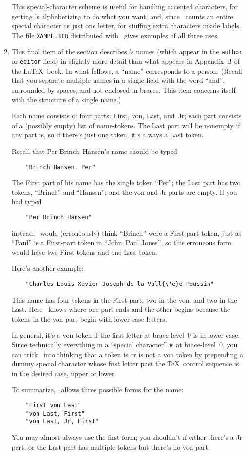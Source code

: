\begin{enumerate}
This special-character scheme is useful for handling accented characters,
for getting \BibTeX's alphabetizing to do what you want,
and, since \BibTeX\ counts an entire special character as just one letter,
for stuffing extra characters inside labels.
The file \hbox{\tt XAMPL.BIB} distributed with \BibTeX\
gives examples of all three uses.

\item
This final item of the section describes \BibTeX's names
(which appear in the \hbox{\tt author} or \hbox{\tt editor} field)
in slightly more detail than what
appears in Appendix~B of the \LaTeX\ book.
In what follows, a ``name'' corresponds to a person.
(Recall that you separate multiple names in a single field
with the word ``and''$\!$, surrounded by spaces,
and not enclosed in braces.
This item concerns itself with the structure of a single name.)

Each name consists of four parts: First, von, Last, and~Jr;
each part consists of a (possibly empty) list of name-tokens.
The Last part will be nonempty if any part is,
so if there's just one token, it's always a Last token.

Recall that Per Brinch~Hansen's name should be typed
\begin{verbatim}
    "Brinch Hansen, Per"
\end{verbatim}
The First part of his name has the single token ``Per'';
the Last part has two tokens, ``Brinch'' and ``Hansen'';
and the von and Jr parts are empty.
If you had typed
\begin{verbatim}
    "Per Brinch Hansen"
\end{verbatim}
instead, \BibTeX\ would (erroneously) think ``Brinch'' were a First-part token,
just as ``Paul'' is a First-part token in ``John~Paul Jones''$\!$,
so this erroneous form would have two First tokens and one Last token.

Here's another example:
\begin{verbatim}
    "Charles Louis Xavier Joseph de la Vall{\'e}e Poussin"
\end{verbatim}
This name has four tokens in the First part, two in the von, and
two in the Last.
Here \BibTeX\ knows where one part ends and the other begins because
the tokens in the von part begin with lower-case letters.

In general, it's a von token if the first letter at brace-level~0
is in lower case.
Since technically everything
in a ``special character'' is at brace-level~0,
you can trick \BibTeX\ into thinking that
a token is or is not a von token by prepending a dummy
special character whose first letter past the \TeX\ control sequence
is in the desired case, upper or lower.

To summarize, \BibTeX\ allows three possible forms for the name:
\begin{verbatim}
    "First von Last"
    "von Last, First"
    "von Last, Jr, First"
\end{verbatim}
You may almost always use the first form;
you shouldn't if either there's a Jr part,
or the Last part has multiple tokens but there's no von part.

\end{enumerate}

%
%

